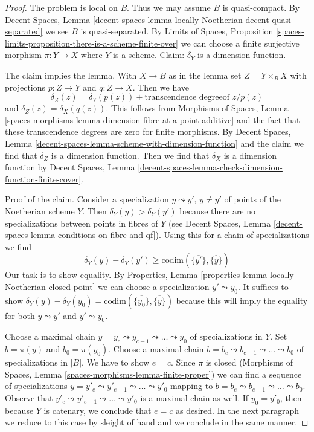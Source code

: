 \documentclass[10pt,a4paper]{amsart}
\theoremstyle{plain}
\theoremstyle{definition}
\theoremstyle{remark}
\numberwithin{equation}{subsection}
\begin{document}
\begin{proof}
The problem is local on $B$. Thus we may assume $B$ is quasi-compact.
By Decent Spaces, Lemma
\ref{decent-spaces-lemma-locally-Noetherian-decent-quasi-separated}
we see $B$ is quasi-separated. By
Limits of Spaces, Proposition
\ref{spaces-limits-proposition-there-is-a-scheme-finite-over}
we can choose a finite surjective morphism $\pi : Y \to X$
where $Y$ is a scheme.
Claim: $\delta_Y$ is a dimension function.

\medskip\noindent
The claim implies the lemma. With $X \to B$ as in the lemma
set $Z = Y \times_B X$ with projections $p : Z \to Y$ and $q : Z \to X$.
Then we have
$$
\delta_Z(z) = \delta_Y(p(z)) + \text{transcendence degreeof }z/p(z)
$$
and $\delta_Z(z) = \delta_X(q(z))$. This follows from
Morphisms of Spaces, Lemma 
\ref{spaces-morphisms-lemma-dimension-fibre-at-a-point-additive}
and the fact that these transcendence degrees are zero
for finite morphisms. By Decent Spaces, Lemma
\ref{decent-spaces-lemma-scheme-with-dimension-function}
and the claim we find that $\delta_Z$ is a dimension function.
Then we find that $\delta_X$ is a dimension function by
Decent Spaces, Lemma
\ref{decent-spaces-lemma-check-dimension-function-finite-cover}.

\medskip\noindent
Proof of the claim. Consider a specialization $y \leadsto y'$,
$y \not = y'$ of points of the Noetherian scheme $Y$.
Then $\delta_Y(y) > \delta_Y(y')$ because there are
no specializations between points in fibres of $Y$
(see Decent Spaces, Lemma
\ref{decent-spaces-lemma-conditions-on-fibre-and-qf}).
Using this for a chain of specializations we find
$$
\delta_Y(y) - \delta_Y(y') \geq
\text{codim}(\overline{\{y'\}}, \overline{\{y\}})
$$
Our task is to show equality. By
Properties, Lemma \ref{properties-lemma-locally-Noetherian-closed-point}
we can choose a specialization $y' \leadsto y_0$.
It suffices to show
$\delta_Y(y) - \delta_Y(y_0) =
\text{codim}(\overline{\{y_0\}}, \overline{\{y\}})$
because this will imply the equality for both
$y \leadsto y'$ and $y' \leadsto y_0$.

\medskip\noindent
Choose a maximal chain
$y = y_c \leadsto y_{c - 1} \leadsto \ldots \leadsto y_0$
of specializations in $Y$.
Set $b = \pi(y)$ and $b_0 = \pi(y_0)$.
Choose a maximal chain
$b = b_e \leadsto b_{e - 1} \leadsto \ldots \leadsto b_0$
of specializations in $|B|$.
We have to show $e = c$.
Since $\pi$ is closed
(Morphisms of Spaces, Lemma \ref{spaces-morphisms-lemma-finite-proper})
we can find a sequence of specializations
$y = y'_e \leadsto y'_{e - 1} \leadsto \ldots \leadsto y'_0$
mapping to
$b = b_e \leadsto b_{e - 1} \leadsto \ldots \leadsto b_0$.
Observe that $y'_e \leadsto y'_{e - 1} \leadsto \ldots \leadsto y'_0$
is a maximal chain as well.
If $y_0 = y'_0$, then because $Y$ is catenary, we conclude
that $e = c$ as desired. In the next paragraph we reduce to
this case by sleight of hand and we conclude in the same manner.


\end{proof}
\end{document}
